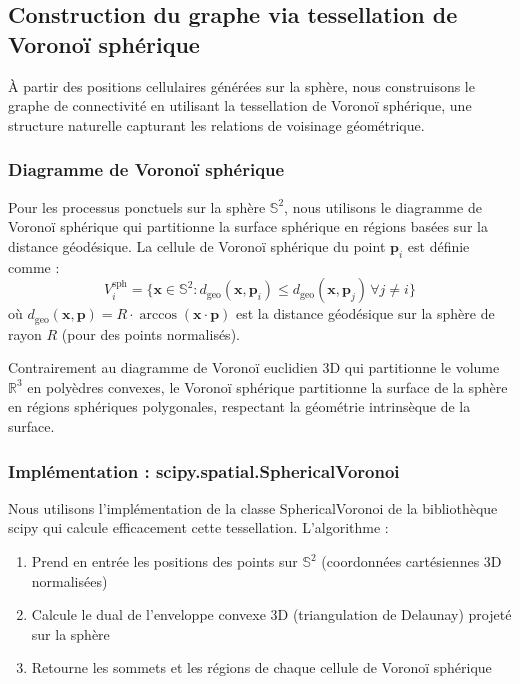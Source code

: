 \subsection{Construction du graphe via tessellation de Voronoï sphérique}

À partir des positions cellulaires générées sur la sphère, nous construisons le graphe de connectivité en utilisant la tessellation de Voronoï sphérique, une structure naturelle capturant les relations de voisinage géométrique.

\subsubsection{Diagramme de Voronoï sphérique}

Pour les processus ponctuels sur la sphère $\mathbb{S}^2$, nous utilisons le diagramme de Voronoï sphérique qui partitionne la surface sphérique en régions basées sur la distance géodésique. La cellule de Voronoï sphérique du point $\mathbf{p}_i$ est définie comme :
\[
V_i^{\text{sph}} = \{\mathbf{x} \in \mathbb{S}^2 : d_{\text{geo}}(\mathbf{x}, \mathbf{p}_i) \leq d_{\text{geo}}(\mathbf{x}, \mathbf{p}_j) \, \forall j \neq i\}
\]
où $d_{\text{geo}}(\mathbf{x}, \mathbf{p}) = R \cdot \arccos(\mathbf{x} \cdot \mathbf{p})$ est la distance géodésique sur la sphère de rayon $R$ (pour des points normalisés).

Contrairement au diagramme de Voronoï euclidien 3D qui partitionne le volume $\mathbb{R}^3$ en polyèdres convexes, le Voronoï sphérique partitionne la surface de la sphère en régions sphériques polygonales, respectant la géométrie intrinsèque de la surface.

\subsubsection{Implémentation : scipy.spatial.SphericalVoronoi}

Nous utilisons l'implémentation de la classe SphericalVoronoi de la bibliothèque scipy qui calcule efficacement cette tessellation. L'algorithme :
\begin{enumerate}
    \item Prend en entrée les positions des points sur $\mathbb{S}^2$ (coordonnées cartésiennes 3D normalisées)
    \item Calcule le dual de l'enveloppe convexe 3D (triangulation de Delaunay) projeté sur la sphère
    \item Retourne les sommets et les régions de chaque cellule de Voronoï sphérique
\end{enumerate}

